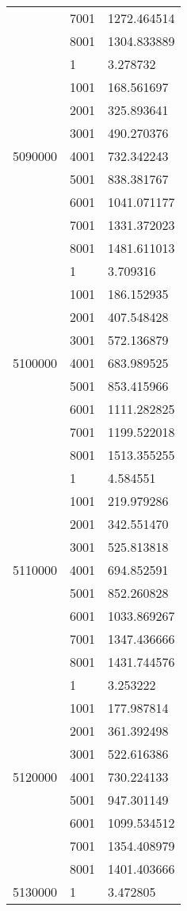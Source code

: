 \begin{table}[htb!]
\begin{tabular}{lll}
 & 7001 & 1272.464514 \\
 & 8001 & 1304.833889 \\
\multirow[c]{9}{*}{5090000} & 1 & 3.278732 \\
 & 1001 & 168.561697 \\
 & 2001 & 325.893641 \\
 & 3001 & 490.270376 \\
 & 4001 & 732.342243 \\
 & 5001 & 838.381767 \\
 & 6001 & 1041.071177 \\
 & 7001 & 1331.372023 \\
 & 8001 & 1481.611013 \\
\multirow[c]{9}{*}{5100000} & 1 & 3.709316 \\
 & 1001 & 186.152935 \\
 & 2001 & 407.548428 \\
 & 3001 & 572.136879 \\
 & 4001 & 683.989525 \\
 & 5001 & 853.415966 \\
 & 6001 & 1111.282825 \\
 & 7001 & 1199.522018 \\
 & 8001 & 1513.355255 \\
\multirow[c]{9}{*}{5110000} & 1 & 4.584551 \\
 & 1001 & 219.979286 \\
 & 2001 & 342.551470 \\
 & 3001 & 525.813818 \\
 & 4001 & 694.852591 \\
 & 5001 & 852.260828 \\
 & 6001 & 1033.869267 \\
 & 7001 & 1347.436666 \\
 & 8001 & 1431.744576 \\
\multirow[c]{9}{*}{5120000} & 1 & 3.253222 \\
 & 1001 & 177.987814 \\
 & 2001 & 361.392498 \\
 & 3001 & 522.616386 \\
 & 4001 & 730.224133 \\
 & 5001 & 947.301149 \\
 & 6001 & 1099.534512 \\
 & 7001 & 1354.408979 \\
 & 8001 & 1401.403666 \\
\multirow[c]{9}{*}{5130000} & 1 & 3.472805 \\

\end{tabular}
\end{table}
